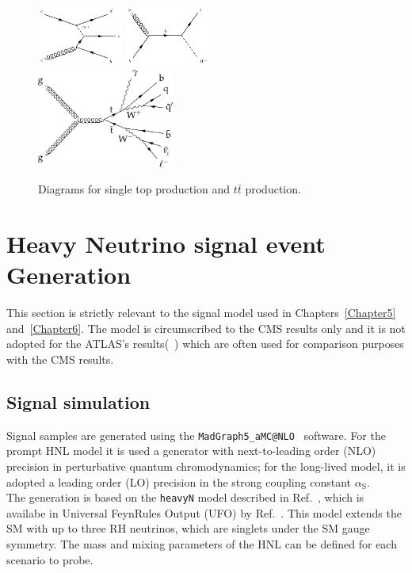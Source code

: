 \begin{figure}[h!]
\centering
 \includegraphics[width=0.25\textwidth]{Figures/c4/dia/60100003.pdf}
  \includegraphics[width=0.25\textwidth]{Figures/c4/dia/60100001.pdf}\\
  \includegraphics[width=0.4\textwidth]{Figures/c4/dia/Figure_001-a_tt.png} 
  \caption{Diagrams for single top production and $t\bar{t}$ production.~\cite{diagram}}
  \label{fig:c46}
\end{figure}



\clearpage
\section{Heavy Neutrino signal event Generation}\label{sec:c4hnl}
This section is strictly relevant to the signal model used in
Chapters~\ref{Chapter5} and~\ref{Chapter6}. The model is circumscribed to the
CMS results only and it is not adopted for the ATLAS's
results(~\cite{atlasintro2}) which are often used for comparison
purposes with the CMS results.



\subsection{Signal simulation}\label{sec:c4hnlmodel}

Signal samples are generated using the
\texttt{MadGraph5\_aMC@NLO}~\cite{Alwall_2014} software. 
For the prompt HNL
model it is used a generator with next-to-leading order (NLO) precision
in perturbative quantum chromodynamics; for the long-lived model, it
is adopted a leading order (LO) precision in the strong
coupling constant $\alpha_{\mathrm{S}}$.\\
The generation is based on the \texttt{heavyN} model described in
Ref.~\cite{Atre:2009rg}, which is availabe in Universal FeynRules
Output (UFO) by Ref.~\cite{Alva:2014gxa,Degrande_2016,heavyN}.
This model extends the SM with up to three RH neutrinos,
which are singlets under the SM gauge symmetry.
The mass and mixing parameters of the HNL can be defined for each
scenario to probe.

